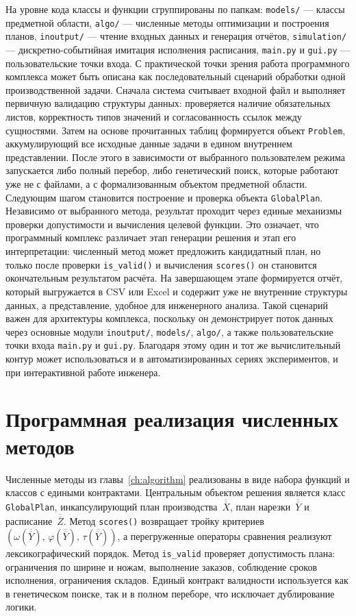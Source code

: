 На уровне кода классы и функции сгруппированы по папкам:
\texttt{models/} --- классы предметной области,
\texttt{algo/} --- численные методы оптимизации и построения планов,
\texttt{inoutput/} --- чтение входных данных и генерация отчётов,
\texttt{simulation/} --- дискретно-событийная имитация исполнения расписания,
\texttt{main.py} и \texttt{gui.py} --- пользовательские точки входа.
С практической точки зрения работа программного комплекса может быть описана как последовательный сценарий обработки одной производственной задачи. Сначала система считывает входной файл и выполняет первичную валидацию структуры данных: проверяется наличие обязательных листов, корректность типов значений и согласованность ссылок между сущностями. Затем на основе прочитанных таблиц формируется объект \texttt{Problem}, аккумулирующий все исходные данные задачи в едином внутреннем представлении. После этого в зависимости от выбранного пользователем режима запускается либо полный перебор, либо генетический поиск, которые работают уже не с файлами, а с формализованным объектом предметной области.
Следующим шагом становится построение и проверка объекта \texttt{GlobalPlan}. Независимо от выбранного метода, результат проходит через единые механизмы проверки допустимости и вычисления целевой функции. Это означает, что программный комплекс различает этап генерации решения и этап его интерпретации: численный метод может предложить кандидатный план, но только после проверки \texttt{is\_valid()} и вычисления \texttt{scores()} он становится окончательным результатом расчёта. На завершающем этапе формируется отчёт, который выгружается в CSV или Excel и содержит уже не внутренние структуры данных, а представление, удобное для инженерного анализа.
Такой сценарий важен для архитектуры комплекса, поскольку он демонстрирует поток данных через основные модули \texttt{inoutput/}, \texttt{models/}, \texttt{algo/}, а также пользовательские точки входа \texttt{main.py} и \texttt{gui.py}. Благодаря этому один и тот же вычислительный контур может использоваться и в автоматизированных сериях экспериментов, и при интерактивной работе инженера.

\section{Программная реализация численных методов}\label{sec:software/algorithms}

Численные методы из главы~\ref{ch:algorithm} реализованы в виде набора функций и классов с едиными контрактами.
Центральным объектом решения является класс \texttt{GlobalPlan}, инкапсулирующий план производства~$\overline{\overline{X}}$, план нарезки~$\overline{\overline{Y}}$ и расписание~$\overline{\overline{Z}}$.
Метод \texttt{scores()} возвращает тройку критериев $(\omega(\overline{\overline{Y}}),\,\varphi(\overline{\overline{Y}}),\,\tau(\overline{\overline{Y}}))$, а перегруженные операторы сравнения реализуют лексикографический порядок.
Метод \texttt{is\_valid} проверяет допустимость плана: ограничения по ширине и ножам, выполнение заказов, соблюдение сроков исполнения, ограничения складов.
Единый контракт валидности используется как в генетическом поиске, так и в полном переборе, что исключает дублирование логики.

